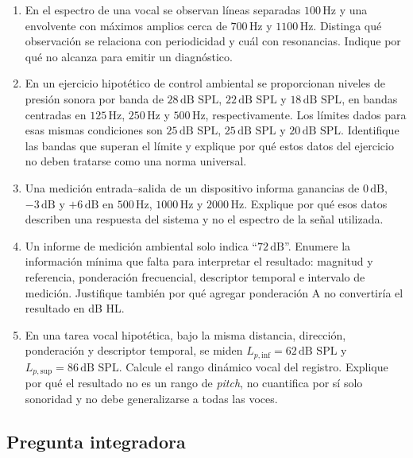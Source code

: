 \begin{enumerate}[label=\textbf{F\arabic*.},leftmargin=*]
    \item En el espectro de una vocal se observan líneas separadas
    \(100\,\text{Hz}\) y una envolvente con máximos amplios cerca de
    \(700\,\text{Hz}\) y \(1100\,\text{Hz}\). Distinga qué observación se
    relaciona con periodicidad y cuál con resonancias. Indique por qué no
    alcanza para emitir un diagnóstico.

    \item En un ejercicio hipotético de control ambiental se proporcionan
    niveles de presión sonora por banda de \(28\,\text{dB SPL}\),
    \(22\,\text{dB SPL}\) y \(18\,\text{dB SPL}\), en bandas centradas en
    \(125\,\text{Hz}\), \(250\,\text{Hz}\) y \(500\,\text{Hz}\),
    respectivamente. Los límites dados para esas mismas condiciones son
    \(25\,\text{dB SPL}\), \(25\,\text{dB SPL}\) y
    \(20\,\text{dB SPL}\). Identifique las bandas que superan el límite y
    explique por qué estos datos del ejercicio no deben tratarse como una
    norma universal.

    \item Una medición entrada--salida de un dispositivo informa ganancias de
    \(0\,\text{dB}\), \(-3\,\text{dB}\) y \(+6\,\text{dB}\) en
    \(500\,\text{Hz}\), \(1000\,\text{Hz}\) y \(2000\,\text{Hz}\).
    Explique por qué esos datos describen una respuesta del sistema y no el
    espectro de la señal utilizada.

    \item Un informe de medición ambiental solo indica ``\(72\,\text{dB}\)''.
    Enumere la información mínima que falta para interpretar el resultado:
    magnitud y referencia, ponderación frecuencial, descriptor temporal e
    intervalo de medición. Justifique también por qué agregar ponderación A no
    convertiría el resultado en dB HL.

    \item En una tarea vocal hipotética, bajo la misma distancia, dirección,
    ponderación y descriptor temporal, se miden
    \(L_{p,\mathrm{inf}}=62\,\text{dB SPL}\) y
    \(L_{p,\mathrm{sup}}=86\,\text{dB SPL}\). Calcule el rango dinámico vocal
    del registro. Explique por qué el resultado no es un rango de
    \emph{pitch}, no cuantifica por sí solo sonoridad y no debe generalizarse a
    todas las voces.
\end{enumerate}

\subsection*{Pregunta integradora}

